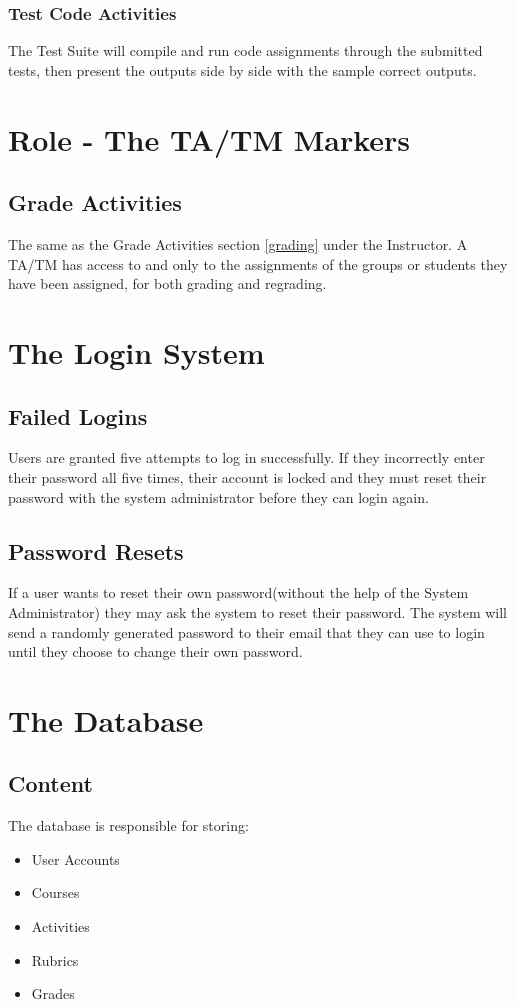 \documentclass{article}
\begin{document}
\subsubsection{Test Code Activities}
The Test Suite will compile and run code assignments through the submitted tests,
then present the outputs side by side with the sample correct outputs.

\section{Role - The TA/TM Markers \label{Marker}}
\subsection{Grade Activities}
The same as the Grade Activities section \ref {grading} under the Instructor.
A TA/TM has access to and only to the assignments of the groups or students they
have been assigned, for both grading and regrading.

\section{The Login System}
\subsection{Failed Logins \label{loginSystem1}}
Users are granted five attempts to log in successfully.  If they incorrectly
enter their password all five times, their account is locked and they must reset
their password with the system administrator before they can login again.
\subsection{Password Resets \label{loginSystem2}}
If a user wants to reset their own password(without the help of the System
Administrator) they may ask the system to reset their password.  The system will
send a randomly generated password to their email that they can use to login
until they choose to change their own password.

\section{The Database}
\subsection{Content}
The database is responsible for storing:
\begin{itemize}
\item User Accounts
\item Courses
\item Activities
\item Rubrics
\item Grades
\end{itemize}
\end{document}
